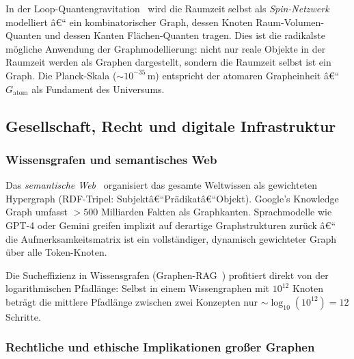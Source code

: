 ﻿\documentclass[12pt,a4paper,twoside]{article}
\theoremstyle{definition}
\theoremstyle{plain}
\theoremstyle{remark}
\begin{document}
In der Loop-Quantengravitation~\cite{Rovelli2004} wird die
Raumzeit selbst als \emph{Spin-Netzwerk} modelliert â€“
ein kombinatorischer Graph, dessen Knoten Raum-Volumen-Quanten
und dessen Kanten Flächen-Quanten tragen.  Dies ist die
radikalste mögliche Anwendung der Graphmodellierung:
nicht nur reale Objekte in der Raumzeit werden als Graphen
dargestellt, sondern die Raumzeit selbst ist ein Graph.
Die Planck-Skala ($\sim 10^{-35}\,$m) entspricht der
atomaren Grapheinheit â€“ $G_{\text{atom}}$ als Fundament
des Universums.

\subsection{Gesellschaft, Recht und digitale Infrastruktur}
\label{sub:gesellschaft}

\subsubsection{Wissensgrafen und semantisches Web}

Das \emph{semantische Web}~\cite{Berners-Lee2001} organisiert
das gesamte Weltwissen als gewichteten Hypergraph (RDF-Tripel:
Subjektâ€“Prädikatâ€“Objekt).  Google's Knowledge Graph umfasst
$> 500$ Milliarden Fakten als Graphkanten.  Sprachmodelle wie
GPT-4 oder Gemini greifen implizit auf derartige Graphstrukturen
zurück â€“ die Aufmerksamkeitsmatrix ist ein vollständiger,
dynamisch gewichteter Graph über alle Token-Knoten.

Die Sucheffizienz in Wissensgrafen (Graphen-RAG~\cite{Edge2024})
profitiert direkt von der logarithmischen Pfadlänge:
Selbst in einem Wissengraphen mit $10^{12}$ Knoten beträgt
die mittlere Pfadlänge zwischen zwei Konzepten nur
$\sim \log_{10}(10^{12}) = 12$ Schritte.

\subsubsection{Rechtliche und ethische Implikationen großer Graphen}
\end{document}

